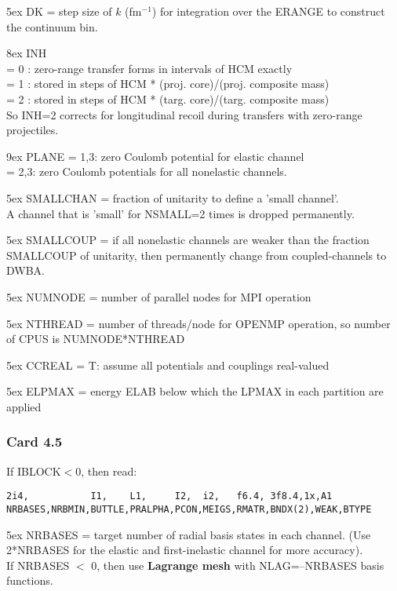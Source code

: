 \documentclass[11pt]{article}
\begin{document}
\hangindent 5ex
DK     = step size of $k$ (fm$^{-1}$) for integration over
the ERANGE to construct the continuum bin.

\hangindent 8ex  INH
\\ = 0 : zero-range transfer forms in intervals of HCM exactly
\\ = 1 : stored in steps of HCM * (proj. core)/(proj. composite mass)
\\ = 2 : stored in steps of HCM * (targ. core)/(targ. composite mass)\\
    So INH=2 corrects for longitudinal recoil during transfers with zero-range projectiles.



\hangindent 9ex
PLANE = 1,3: zero Coulomb potential for elastic channel\\
      = 2,3: zero Coulomb potentials for all nonelastic channels.

\hangindent 5ex
SMALLCHAN = fraction of unitarity to define a 'small channel'.\\
A channel that is 'small' for NSMALL=2 times is dropped permanently.

\hangindent 5ex
SMALLCOUP = if all nonelastic channels are weaker than the fraction
SMALLCOUP of unitarity, then permanently change from coupled-channels to DWBA.

\hangindent 5ex
NUMNODE = number of parallel nodes for MPI operation

\hangindent 5ex
NTHREAD = number of threads/node for OPENMP operation, so number of CPUS is NUMNODE*NTHREAD

\hangindent 5ex
CCREAL = T: assume all potentials and couplings real-valued

\hangindent 5ex
ELPMAX = energy ELAB below which the LPMAX in each partition are applied 

\subsubsection*{Card 4.5}
If IBLOCK$<$0, then read:
\begin{verbatim}
2i4,           I1,    L1,     I2,  i2,   f6.4, 3f8.4,1x,A1
NRBASES,NRBMIN,BUTTLE,PRALPHA,PCON,MEIGS,RMATR,BNDX(2),WEAK,BTYPE
\end{verbatim}


\hangindent 5ex
NRBASES = target number of radial basis states in each channel.
(Use 2*NRBASES for the elastic and first-inelastic channel for more accuracy).\\
If NRBASES $<$ 0, then use {\bf Lagrange mesh} with NLAG=--NRBASES basis functions.
\end{document}
